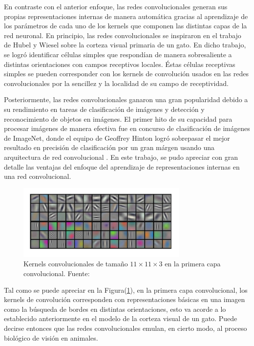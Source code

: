        En contraste con el anterior enfoque, las redes convolucionales generan sus propias representaciones internas
        de manera automática gracias al aprendizaje de los parámetros de cada uno de los kernels que componen las distintas 
        capas de la red neuronal. En principio, las redes convolucionales se inspiraron en el trabajo de Hubel y Wiesel 
        sobre la corteza visual primaria de un gato\cite{lecun2010convolutional}. En dicho trabajo, se logró identificar células simples que respondían
        de manera sobresaliente a distintas orientaciones con campos receptivos locales. Éstas células receptivas simples 
        se pueden corresponder con los kernels de convolución usados en las redes convolucionales por la sencillez y la 
        localidad de su campo de receptividad.

        Posteriormente, las redes convolucionales ganaron una gran popularidad debido a su rendimiento en tareas de 
        clasificación de imágenes y detección y reconocimiento de objetos en imágenes. El primer hito de su capacidad 
        para procesar imágenes de manera efectiva fue en concurso de clasificación de imágenes de ImageNet, donde 
        el equipo de Geoffrey Hinton logró sobrepasar el mejor resultado en precisión de clasificación por un gran márgen 
        usando una arquitectura de red convolucional \cite{krizhevsky2012imagenet}. En este trabajo, se pudo apreciar con 
        gran detalle las ventajas del enfoque del aprendizaje de representaciones internas en una red convolucional.

        \begin{figure}[!h] 
            \centering
            \includegraphics[width=0.75\textwidth]{img/fmap_imagenet}
            \caption{Kernels convolucionales de tamaño $11 \times 11 \times 3$ en la primera capa convolucional. Fuente: \cite{krizhevsky2012imagenet} }
            \label{fig:fmap_imagenet}
        \end{figure}
            
        Tal como se puede apreciar en la Figura(\ref{fig:fmap_imagenet}), en la primera capa convolucional, 
        los kernels de convolución corresponden con representaciones básicas en una imagen como la búsqueda de 
        bordes en distintas orientaciones, esto va acorde a lo establecido anteriormente en el modelo de 
        la corteza visual de un gato. Puede decirse entonces que las redes convolucionales emulan, en cierto modo, 
        al proceso biológico de visión en animales.

